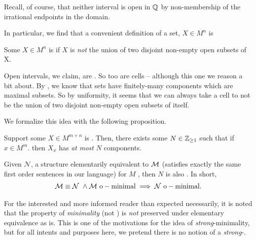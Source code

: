 \begin{svgraybox}
  Recall, of course, that neither interval is open in $\mathbb{Q}$ by non-membership of the irrational endpoints in the domain.
\end{svgraybox}

In particular, we find that a convenient definition of a  set, $X \in M^n$ is

\begin{definition}
  Some $X \in M^n$ is  if $X$ is \emph{not} the union of two disjoint non-empty  open subsets of X.
\end{definition}


\begin{example}
  Open intervals, we claim, are . So too are cells -- although this one we reason a bit about. By \CD, we know that  sets have finitely-many  components which are maximal  \cnctd subsets. So by uniformity, it seems that we can always take a cell to not be the union of two disjoint non-empty  open subsets of itself.

\end{example}

We formalize this idea with the following proposition.

\begin{proposition}
  \label{prop:dfnblycnctd}
  Support some $X \in M^{m + n}$ is . Then, there exists some $N \in \mathbb{Z}_{\geq 1}$ such that if $x \in M^m$. then $X_x$ has \emph{at most} $N$  components.
\end{proposition}

\begin{corollary}
  Given $\mathcal{N}$, a structure elementarily equivalent to $\mathcal{M}$ (satisfies exactly the same first order sentences in our language) for $M$ \om, then $N$ is also \om. In short,
  \begin{align*}
    \mathcal{M} \equiv \mathcal{N} \ \wedge \mathcal{M} \ \mathrm{o-minimal} \implies \mathcal{N} \ \mathrm{o-minimal}.
  \end{align*}
\end{corollary}

\begin{svgraybox}
  For the interested and more informed reader than expected necessarily, it is noted that the property of \emph{minimality} (not \omy) is \emph{not} preserved under elementary equivalence as \omy is. This is one of the motivations for the idea of \emph{strong}-minimality, but for all intents and purposes here, we pretend there is no notion of a \emph{strong}-\omy.
\end{svgraybox}

